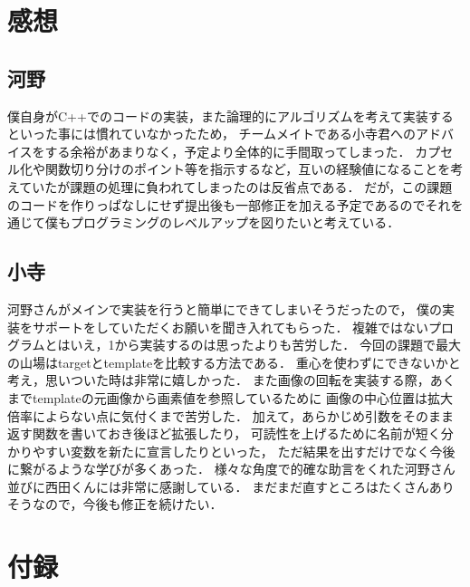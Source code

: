\documentclass[uplatex,dvipdfmx]{jsarticle}
\begin{document}
\section{感想}
\subsection{河野}
僕自身がC++でのコードの実装，また論理的にアルゴリズムを考えて実装するといった事には慣れていなかったため，
チームメイトである小寺君へのアドバイスをする余裕があまりなく，予定より全体的に手間取ってしまった．
カプセル化や関数切り分けのポイント等を指示するなど，互いの経験値になることを考えていたが課題の処理に負われてしまったのは反省点である．
だが，この課題のコードを作りっぱなしにせず提出後も一部修正を加える予定であるのでそれを通じて僕もプログラミングのレベルアップを図りたいと考えている．

\subsection{小寺}
河野さんがメインで実装を行うと簡単にできてしまいそうだったので，
僕の実装をサポートをしていただくお願いを聞き入れてもらった．
複雑ではないプログラムとはいえ，1から実装するのは思ったよりも苦労した．
今回の課題で最大の山場はtargetとtemplateを比較する方法である．
重心を使わずにできないかと考え，思いついた時は非常に嬉しかった．
また画像の回転を実装する際，あくまでtemplateの元画像から画素値を参照しているために
画像の中心位置は拡大倍率によらない点に気付くまで苦労した．
加えて，あらかじめ引数をそのまま返す関数を書いておき後ほど拡張したり，
可読性を上げるために名前が短く分かりやすい変数を新たに宣言したりといった，
ただ結果を出すだけでなく今後に繋がるような学びが多くあった．
様々な角度で的確な助言をくれた河野さん並びに西田くんには非常に感謝している．
まだまだ直すところはたくさんありそうなので，今後も修正を続けたい．


\section*{付録}

\end{document}
